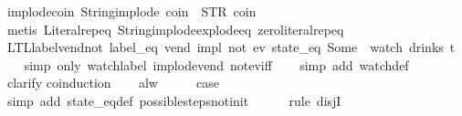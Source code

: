 \begin{isabellebody}
\endisatagproof
{\isafoldproof}%
%
\isadelimproof
\isanewline
%
\endisadelimproof
\isanewline
{}\isamarkupfalse%
\ implode{\isacharunderscore}coin{\isacharcolon}\ {\isachardoublequoteopen}String{\isachardot}implode\ {\isacharprime}{\isacharprime}coin{\isacharprime}{\isacharprime}\ {\isacharequal}\ STR\ {\isacharprime}{\isacharprime}coin{\isacharprime}{\isacharprime}{\isachardoublequoteclose}\isanewline
%
\isadelimproof
\ \ %
\endisadelimproof
%
\isatagproof
{}\isamarkupfalse%
\ {\isacharparenleft}metis\ Literal{\isachardot}rep{\isacharunderscore}eq\ String{\isachardot}implode{\isacharunderscore}explode{\isacharunderscore}eq\ zero{\isacharunderscore}literal{\isachardot}rep{\isacharunderscore}eq{\isacharparenright}%
\endisatagproof
{\isafoldproof}%
%
\isadelimproof
\isanewline
%
\endisadelimproof
\isanewline
{}\isamarkupfalse%
\ LTL{\isacharunderscore}label{\isacharunderscore}vend{\isacharunderscore}not{\isacharunderscore}{}{\isacharcolon}\ {\isachardoublequoteopen}{\isacharparenleft}{\isacharparenleft}label_eq\ {\isacharprime}{\isacharprime}vend{\isacharprime}{\isacharprime}{\isacharparenright}\ impl\ {\isacharparenleft}not\ {\isacharparenleft}ev\ {\isacharparenleft}state_eq\ {\isacharparenleft}Some\ {}{\isacharparenright}{\isacharparenright}{\isacharparenright}{\isacharparenright}{\isacharparenright}\ {\isacharparenleft}watch\ drinks\ t{\isacharparenright}{\isachardoublequoteclose}\isanewline
%
\isadelimproof
\ \ %
\endisadelimproof
%
\isatagproof
{}\isamarkupfalse%
\ {\isacharparenleft}simp\ only{\isacharcolon}\ watch{\isacharunderscore}label\ implode{\isacharunderscore}vend\ not{\isacharunderscore}ev{\isacharunderscore}iff{\isacharparenright}\isanewline
\ \ \isamarkupfalse%
\ {\isacharparenleft}simp\ add{\isacharcolon}\ watch{\isacharunderscore}def{\isacharparenright}\isanewline
\ \ \isamarkupfalse%
\ clarify\isanewline
{}\isamarkupfalse%
{\isacharparenleft}coinduction{\isacharparenright}\isanewline
\ \ \isamarkupfalse%
\ alw\isanewline
\ \ \isamarkupfalse%
\ \isamarkupfalse%
\ {\isacharquery}case\isanewline
\ \ \ \ \isamarkupfalse%
\ {\isacharparenleft}simp\ add{\isacharcolon}\ state_eq{\isacharunderscore}def\ possible{\isacharunderscore}steps{\isacharunderscore}not{\isacharunderscore}init{\isacharparenright}\isanewline
\ \ \ \ \isamarkupfalse%
\ {\isacharparenleft}rule\ disjI{}{\isacharparenright}\isanewline
\ \ \ \ \isamarkupfalse%

\end{isabellebody}
